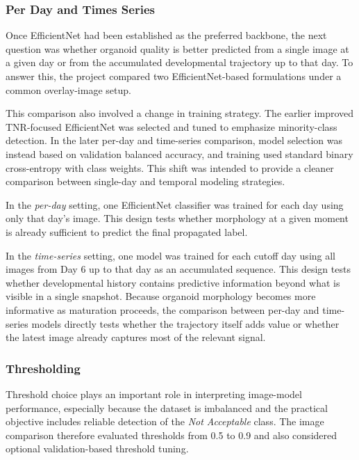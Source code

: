 \documentclass{article}
\begin{document}
\subsubsection{Per Day and Times Series}

Once EfficientNet had been established as the preferred backbone, the next question was whether organoid quality is better predicted from a single image at a given day or from the accumulated developmental trajectory up to that day. To answer this, the project compared two EfficientNet-based formulations under a common overlay-image setup.

This comparison also involved a change in training strategy. The earlier improved TNR-focused EfficientNet was selected and tuned to emphasize minority-class detection. In the later per-day and time-series comparison, model selection was instead based on validation balanced accuracy, and training used standard binary cross-entropy with class weights. This shift was intended to provide a cleaner comparison between single-day and temporal modeling strategies.

In the \textit{per-day} setting, one EfficientNet classifier was trained for each day using only that day's image. This design tests whether morphology at a given moment is already sufficient to predict the final propagated label.

In the \textit{time-series} setting, one model was trained for each cutoff day using all images from Day 6 up to that day as an accumulated sequence. This design tests whether developmental history contains predictive information beyond what is visible in a single snapshot. Because organoid morphology becomes more informative as maturation proceeds, the comparison between per-day and time-series models directly tests whether the trajectory itself adds value or whether the latest image already captures most of the relevant signal.

\subsubsection{Thresholding}

Threshold choice plays an important role in interpreting image-model performance, especially because the dataset is imbalanced and the practical objective includes reliable detection of the \textit{Not Acceptable} class. The image comparison therefore evaluated thresholds from 0.5 to 0.9 and also considered optional validation-based threshold tuning.
\end{document}
